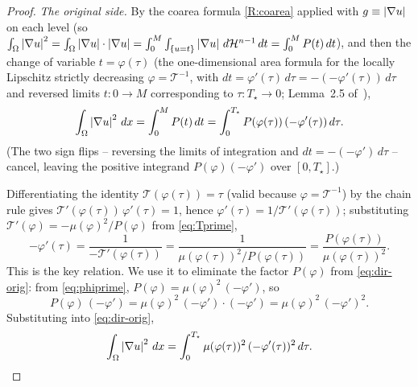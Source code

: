 \begin{proof}
\emph{The original side.} By the coarea formula \ref{R:coarea} applied with
$g\equiv\left|\nabla u\right|$ on each level (so $\int_\Omega\left|\nabla u\right|^2
=\int_\Omega\left|\nabla u\right|\cdot\left|\nabla u\right|=\int_0^M\int_{\{u=t\}}
\left|\nabla u\right|\,d\mathcal H^{n-1}\,dt=\int_0^M P(t)\,dt$), and then the change of variable
$t=\varphi(\tau)$ (the one-dimensional area formula for the locally
Lipschitz strictly decreasing $\varphi=\mathcal T^{-1}$, with $dt=\varphi'(
\tau)\,d\tau=-(-\varphi'(\tau))\,d\tau$ and reversed limits $t:0\to M$
corresponding to $\tau:T_\star\to0$; Lemma~2.5 of~\cite{Brasco2014}),
\begin{equation}\label{eq:dir-orig}
  \int_\Omega\left|\nabla u\right|^2\,dx
  =\int_0^M P(t)\,dt
  =\int_0^{T_\star}P(\varphi(\tau))\,(-\varphi'(\tau))\,d\tau .
\end{equation}
(The two sign flips -- reversing the limits of integration and
$dt=-(-\varphi')\,d\tau$ -- cancel, leaving the positive integrand
$P(\varphi)(-\varphi')$ over $[0,T_\star]$.)

Differentiating the identity $\mathcal T(\varphi(\tau))=\tau$ (valid because
$\varphi=\mathcal T^{-1}$) by the chain rule gives
$\mathcal T'(\varphi(\tau))\,\varphi'(\tau)=1$, hence
$\varphi'(\tau)=1/\mathcal T'(\varphi(\tau))$; substituting
$\mathcal T'(\varphi)=-\mu(\varphi)^2/P(\varphi)$ from \eqref{eq:Tprime},
\begin{equation}\label{eq:phiprime}
  -\varphi'(\tau)=\frac{1}{-\mathcal T'(\varphi(\tau))}
  =\frac{1}{\mu(\varphi(\tau))^2/P(\varphi(\tau))}
  =\frac{P(\varphi(\tau))}{\mu(\varphi(\tau))^2}.
\end{equation}
This is the key relation. We use it to eliminate the factor
$P(\varphi)$ from \eqref{eq:dir-orig}: from \eqref{eq:phiprime},
$P(\varphi)=\mu(\varphi)^2\,(-\varphi')$, so
\[
  P(\varphi)\,(-\varphi')
  =\mu(\varphi)^2\,(-\varphi')\cdot(-\varphi')
  =\mu(\varphi)^2\,(-\varphi')^2 .
\]
Substituting into \eqref{eq:dir-orig},
\begin{equation}\label{eq:dir-orig2}
  \int_\Omega\left|\nabla u\right|^2\,dx
  =\int_0^{T_\star}\mu(\varphi(\tau))^2\,(-\varphi'(\tau))^2\,d\tau.
\end{equation}


\end{proof}
